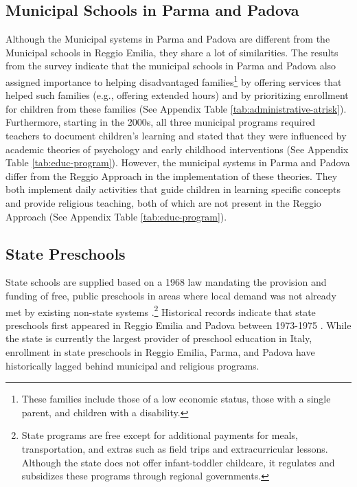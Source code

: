 \subsection{Municipal Schools in Parma and Padova}
Although the Municipal systems in Parma and Padova are different from the Municipal schools in Reggio Emilia, they share a lot of similarities. The results from the survey indicate that the municipal schools in Parma and Padova also assigned importance to helping disadvantaged families\footnote{These families include those of a low economic status, those with a single parent, and children with a disability.} by offering services that helped such families (e.g., offering extended hours) and by prioritizing enrollment for children from these families (See Appendix Table \ref{tab:administrative-atrisk}). Furthermore, starting in the 2000s, all three municipal programs required teachers to document children's learning and stated that they were influenced by academic theories of psychology and early childhood interventions (See Appendix Table \ref{tab:educ-program}). However, the municipal systems in Parma and Padova differ from the Reggio Approach in the implementation of these theories. They both implement daily activities that guide children in learning specific concepts and provide religious teaching, both of which are not present in the Reggio Approach (See Appendix Table \ref{tab:educ-program}). 


\subsection{State Preschools}
State schools are supplied based on a 1968 law mandating the provision and funding of free, public preschools in areas where local demand was not already met by existing non-state systems \citep{Hohnerlein_2009_Paradox-Public-Preschools}.\footnote{State programs are free except for additional payments for meals, transportation, and extras such as field trips and extracurricular lessons. Although the state does not offer infant-toddler childcare, it regulates and subsidizes these programs through regional governments.}  Historical records indicate that state preschools first appeared in Reggio Emilia and Padova between 1973-1975 \citep{Padova-Admin-Data_1964-2011,Reggio-Admin-data_1966-2006,Reggio-Annual-Journals_1994-2011}. While the state is currently the largest provider of preschool education in Italy, enrollment in state preschools in Reggio Emilia, Parma, and Padova have historically lagged behind municipal and religious programs.

